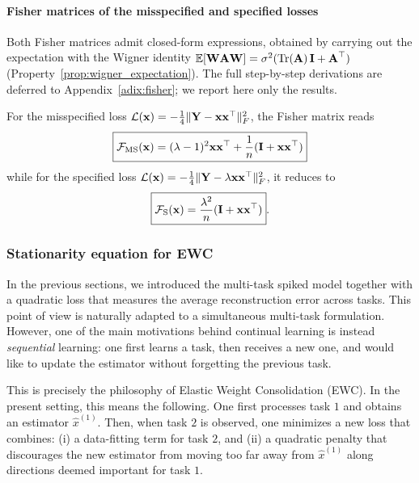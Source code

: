 \documentclass[11pt]{article}
\begin{document}
\paragraph{Fisher matrices of the misspecified and specified losses}
Both Fisher matrices admit closed-form expressions, obtained by carrying out the expectation with the Wigner identity $\mathbb{E}[\boldsymbol{\mathbf{W}} \boldsymbol{\mathbf{A}} \boldsymbol{\mathbf{W}}] = \sigma^2(\mathrm{Tr}(\boldsymbol{\mathbf{A}})\,\boldsymbol{\mathbf{I}} + \boldsymbol{\mathbf{A}}^\top)$ (Property~\ref{prop:wigner_expectation}). The full step-by-step derivations are deferred to Appendix~\ref{adix:fisher}; we report here only the results.

\noindent
For the misspecified loss $\mathcal{L}(\boldsymbol{\mathbf{x}}) = -\tfrac{1}{4} \|\boldsymbol{\mathbf{Y}} - \boldsymbol{\mathbf{x}}\boldsymbol{\mathbf{x}}^\top\|_F^2$, the Fisher matrix reads
\begin{equation}
    \boxed{\mathcal{F}_{\mathrm{MS}}(\boldsymbol{\mathbf{x}}) = (\lambda-1)^2\boldsymbol{\mathbf{x}}\boldsymbol{\mathbf{x}}^\top + \frac{1}{n}(\boldsymbol{\mathbf{I}} + \boldsymbol{\mathbf{x}} \boldsymbol{\mathbf{x}}^\top)}
    \label{eq:fisher_ms}
\end{equation}
while for the specified loss $\mathcal{L}(\boldsymbol{\mathbf{x}}) = -\tfrac{1}{4} \|\boldsymbol{\mathbf{Y}} - \lambda\boldsymbol{\mathbf{x}}\boldsymbol{\mathbf{x}}^\top\|_F^2$, it reduces to
\begin{equation}
    \boxed{\mathcal{F}_{\mathrm{S}}(\boldsymbol{\mathbf{x}}) = \frac{\lambda^2}{n}(\boldsymbol{\mathbf{I}} + \boldsymbol{\mathbf{x}}\boldsymbol{\mathbf{x}}^\top )}.
\end{equation}


\subsubsection{Stationarity equation for EWC}

In the previous sections, we introduced the multi-task spiked model together with a quadratic loss that measures the average reconstruction error across tasks. This point of view is naturally adapted to a simultaneous multi-task formulation. However, one of the main motivations behind continual learning is instead \emph{sequential} learning: one first learns a task, then receives a new one, and would like to update the estimator without forgetting the previous task.

This is precisely the philosophy of Elastic Weight Consolidation (EWC). In the present setting, this means the following. One first processes task $1$ and obtains an estimator $\hat x^{(1)}$. Then, when task $2$ is observed, one minimizes a new loss that combines: 
(i) a data-fitting term for task $2$, and 
(ii) a quadratic penalty that discourages the new estimator from moving too far away from $\hat x^{(1)}$ along directions deemed important for task $1$.
\end{document}
